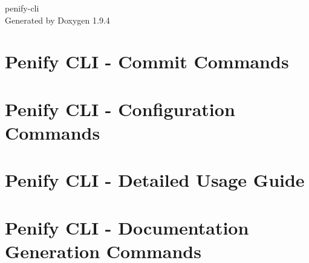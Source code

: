 \documentclass[twoside]{book}
\newcommand{\+}{\discretionary{\mbox{\scriptsize$\hookleftarrow$}}{}{}}
\newcommand{\clearemptydoublepage}{%
    \newpage{\pagestyle{empty}\cleardoublepage}%
  }
\begin{document}
  \raggedbottom
    \hypersetup{pageanchor=false,
                bookmarksnumbered=true,
                pdfencoding=unicode
               }
  \begin{titlepage}
  \vspace*{7cm}
  \begin{center}%
  {\Large penify-\/cli}\\
  \vspace*{1cm}
  {\large Generated by Doxygen 1.9.4}\\
  \end{center}
  \end{titlepage}
  \clearemptydoublepage
  \tableofcontents
  \clearemptydoublepage
  \hypersetup{pageanchor=true}
\chapter{Penify CLI -\/ Commit Commands}
\label{md__tmp_github_reposRepoArchDocGenContext_Penify_dev_penify_cli_docs_commit_commands}

\chapter{Penify CLI -\/ Configuration Commands}
\label{md__tmp_github_reposRepoArchDocGenContext_Penify_dev_penify_cli_docs_config_commands}

\chapter{Penify CLI -\/ Detailed Usage Guide}
\label{md__tmp_github_reposRepoArchDocGenContext_Penify_dev_penify_cli_docs_detailed_usage}

\chapter{Penify CLI -\/ Documentation Generation Commands}
\label{md__tmp_github_reposRepoArchDocGenContext_Penify_dev_penify_cli_docs_doc_commands}

\end{document}
